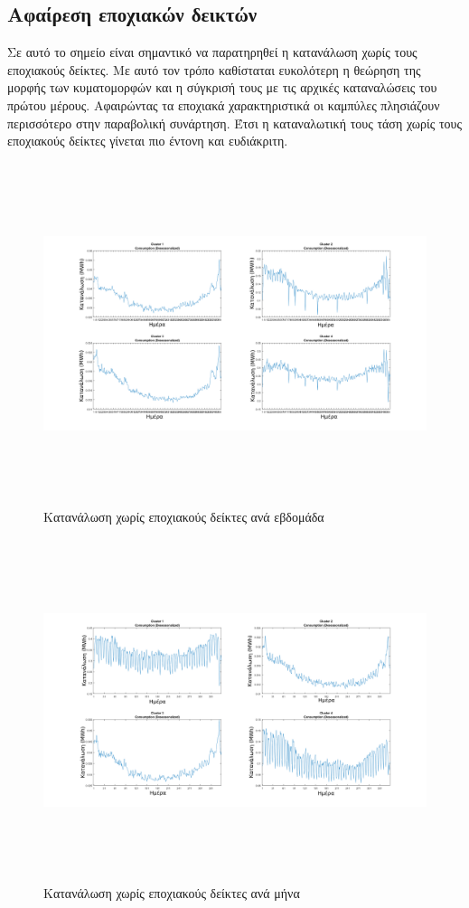 \subsection{Αφαίρεση εποχιακών δεικτών}
Σε αυτό το σημείο είναι σημαντικό να παρατηρηθεί η κατανάλωση χωρίς τους εποχιακούς δείκτες. Με αυτό τον τρόπο καθίσταται ευκολότερη η θεώρηση της μορφής των κυματομορφών και η σύγκρισή τους με τις αρχικές καταναλώσεις του πρώτου μέρους. Αφαιρώντας τα εποχιακά χαρακτηριστικά οι καμπύλες πλησιάζουν περισσότερο στην παραβολική συνάρτηση. Έτσι η καταναλωτική τους τάση χωρίς τους εποχιακούς δείκτες γίνεται πιο έντονη και ευδιάκριτη.\par

\begin{figure}[ht!]
\centering
\includegraphics[width=180mm, height=100mm]{../../plots/Trend_estimation/Deseasonalized_ALL.png}
\caption{Κατανάλωση χωρίς εποχιακούς δείκτες ανά εβδομάδα}
\label{fig:deseason week}
\end{figure}

\begin{figure}[ht!]
\centering
\includegraphics[width=180mm, height=100mm]{../../plots/Trend_estimation/Deseasonalized_month_ALL.png}
\caption{Κατανάλωση χωρίς εποχιακούς δείκτες ανά μήνα}
\label{fig:deseason month}
\end{figure}
\newpage
